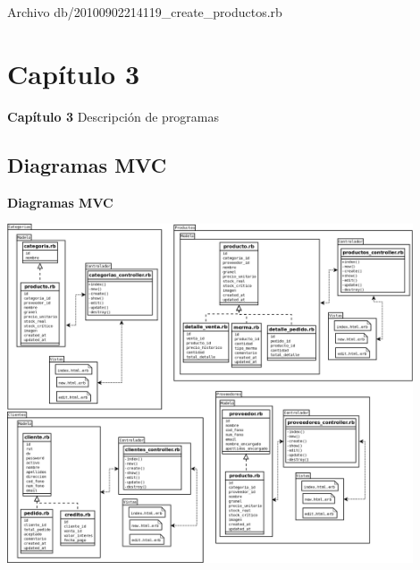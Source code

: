 \documentclass{beamer}
\begin{document}
\begin{frame}
Archivo db/20100902214119\_create\_productos.rb

\end{frame}

\section{Capítulo 3}

\begin{frame}
\textbf{Capítulo 3}
\mbox{}
Descripción de programas
\end{frame}

\subsection{Diagramas MVC}

\begin{frame}
\begin{center}
\textbf{\huge{Diagramas MVC}}
\end{center}
\end{frame}

\begin{frame}
\begin{center}
\includegraphics[width=0.9\textwidth]{images/diagramas/mvcp1.png}
\end{center}
\end{frame}
\end{document}
